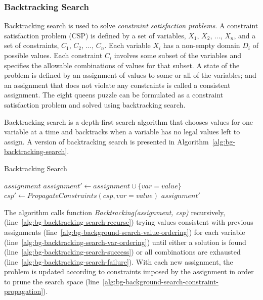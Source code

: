 \subsubsection{Backtracking Search}
\label{sec:bg-backtracking-search}

Backtracking search is used to solve {\em constraint satisfaction
problems}. A constraint satisfaction problem (CSP) is defined by a set
of variables, $X_1$, $X_2$, ..., $X_n$, and a set of constraints,
$C_1$, $C_2$, ..., $C_n$. Each variable $X_i$ has a non-empty domain
$D_i$ of possible values. Each constraint $C_i$ involves some subset
of the variables and specifies the allowable combinations of values
for that subset. A state of the problem is defined by an assignment of
values to some or all of the variables; and an assignment that does
not violate any constraints is called a consistent assignment. The eight
queens puzzle can be formulated as a constraint satisfaction problem
and solved using backtracking search.

Backtracking search is a depth-first search algorithm that chooses
values for one variable at a time and backtracks when a variable has
no legal values left to assign. A version of backtracking search is
presented in Algorithm~\ref{alg:bg-backtracking-search}.
\begin{algorithm}
\caption{Backtracking Search}
\label{alg:bg-backtracking-search}
\begin{algorithmic}[1]
   \Return $assignment$
\EndIf
{} \label{alg:bg-backtracking-search-var-ordering}
 \label{alg:bg-background-search-value-ordering}
  \State $assignment' \leftarrow assignment \cup \{var=value\}$
  \State $csp' \leftarrow PropagateConstraints(csp, var=value)$ \label{alg:bg-background-search-constraint-propagation}
   \label{alg:bg-backtracking-search-recurse}
     \Return $assignment'$ \label{alg:bg-backtracking-search-success}
  \EndIf
\EndFor
{} \label{alg:bg-backtracking-search-failure}
\EndProcedure
\end{algorithmic}
\end{algorithm}
The algorithm calls function {\em Backtracking(assignment, csp)}
recursively, (line~\ref{alg:bg-backtracking-search-recurse})
trying values consistent with previous assignments
(line~\ref{alg:bg-background-search-value-ordering})
for each variable
(line~\ref{alg:bg-backtracking-search-var-ordering})
until either a solution is found
(line~\ref{alg:bg-backtracking-search-success}) or all combinations
are exhausted (line~\ref{alg:bg-backtracking-search-failure}). With
each new assignment, the problem is updated according to constraints
imposed by the assignment in order to prune the search space (line~\ref{alg:bg-background-search-constraint-propagation}).

